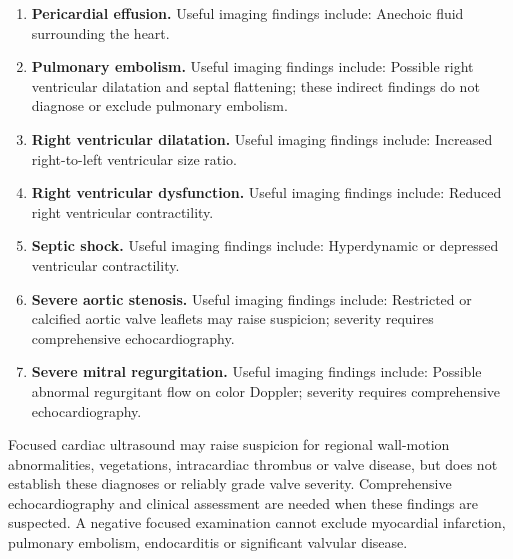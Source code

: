 \begin{enumerate}[leftmargin=*,itemsep=0.45em,topsep=0.4em]
\item \textbf{Pericardial effusion.} Useful imaging findings include: Anechoic fluid surrounding the heart.
\item \textbf{Pulmonary embolism.} Useful imaging findings include: Possible right ventricular dilatation and septal flattening; these indirect findings do not diagnose or exclude pulmonary embolism.
\item \textbf{Right ventricular dilatation.} Useful imaging findings include: Increased right-to-left ventricular size ratio.
\item \textbf{Right ventricular dysfunction.} Useful imaging findings include: Reduced right ventricular contractility.
\item \textbf{Septic shock.} Useful imaging findings include: Hyperdynamic or depressed ventricular contractility.
\item \textbf{Severe aortic stenosis.} Useful imaging findings include: Restricted or calcified aortic valve leaflets may raise suspicion; severity requires comprehensive echocardiography.
\item \textbf{Severe mitral regurgitation.} Useful imaging findings include: Possible abnormal regurgitant flow on color Doppler; severity requires comprehensive echocardiography.
\end{enumerate}
Focused cardiac ultrasound may raise suspicion for regional wall-motion abnormalities, vegetations, intracardiac thrombus or valve disease, but does not establish these diagnoses or reliably grade valve severity. Comprehensive echocardiography and clinical assessment are needed when these findings are suspected. A negative focused examination cannot exclude myocardial infarction, pulmonary embolism, endocarditis or significant valvular disease.

